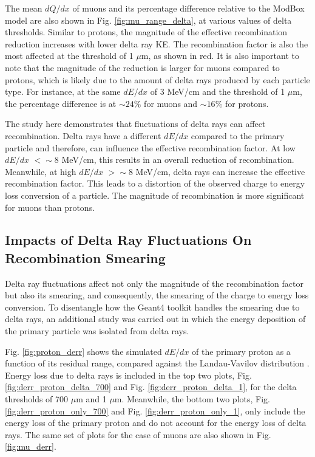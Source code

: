 The mean $dQ/dx$ of muons and its percentage difference relative to the ModBox model are also shown in Fig. \ref{fig:mu_range_delta}, at various values of delta thresholds.
Similar to protons, the magnitude of the effective recombination reduction increases with lower delta ray KE.
The recombination factor is also the most affected at the threshold of 1 $\mu$m, as shown in red.
It is also important to note that the magnitude of the reduction is larger for muons compared to protons, which is likely due to the amount of delta rays produced by each particle type.
For instance, at the same $dE/dx$ of 3 MeV/cm and the threshold of 1 $\mu$m, the percentage difference is at $\sim 24\%$ for muons and $\sim16\%$ for protons.  

The study here demonstrates that fluctuations of delta rays can affect recombination.
Delta rays have a different $dE/dx$ compared to the primary particle and therefore, can influence the effective recombination factor.
At low $dE/dx$ $< \sim 8$ MeV/cm, this results in an overall reduction of recombination.
Meanwhile, at high $dE/dx$ $> \sim 8$ MeV/cm, delta rays can increase the effective recombination factor.
This leads to a distortion of the observed charge to energy loss conversion of a particle. 
The magnitude of recombination is more significant for muons than protons.

\subsection{Impacts of Delta Ray Fluctuations On Recombination Smearing}
\label{sec:impactDeltaRaySmear}

Delta ray fluctuations affect not only the magnitude of the recombination factor but also its smearing, and consequently, the smearing of the charge to energy loss conversion.
To disentangle how the Geant4 toolkit handles the smearing due to delta rays, an additional study was carried out in which the energy deposition of the primary particle was isolated from delta rays. 

Fig. \ref{fig:proton_derr} shows the simulated $dE/dx$ of the primary proton as a function of its residual range, compared against the Landau-Vavilov distribution \cite{Passage}.
Energy loss due to delta rays is included in the top two plots, Fig. \ref{fig:derr_proton_delta_700} and Fig. \ref{fig:derr_proton_delta_1}, for the delta thresholds of 700 $\mu$m and 1 $\mu$m.
Meanwhile, the bottom two plots, Fig. \ref{fig:derr_proton_only_700} and Fig. \ref{fig:derr_proton_only_1}, only include the energy loss of the primary proton and do not account for the energy loss of delta rays.
The same set of plots for the case of muons are also shown in Fig. \ref{fig:mu_derr}.

